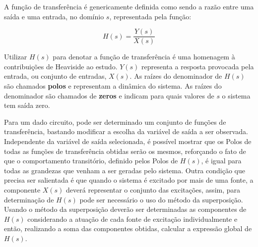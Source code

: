 \documentclass[12pt,fleqn]{book} %
\begin{document}
A função de transferência é genericamente definida como sendo a razão entre uma saída e uma entrada, no domínio $s$, representada pela função:

\begin{equation}
H(s) = \frac{Y(s)}{X(s)}
\end{equation}

Utilizar $H(s)$ para denotar a função de transferência é uma homenagem à contribuições de Heaviside ao estudo. $Y(s)$ representa a resposta provocada pela entrada, ou conjunto de entradas, $X(s)$. As raízes do denominador de $H(s)$ são chamados \textbf{polos} e representam a dinâmica do sistema. As raízes do denominador são chamados de \textbf{zeros} e indicam para quais valores de $s$ o sistema tem saída zero.

Para um dado circuito, pode ser determinado um conjunto de funções de transferência, bastando modificar a escolha da variável de saída a ser observada. Independente da variável de saída selecionada, é possível mostrar que os Polos de todas as funções de transferência obtidas serão os mesmos, reforçando o fato de que o comportamento transitório, definido pelos Polos de $H(s)$, é igual para todas as grandezas que venham a ser geradas pelo sistema. Outra condição que precisa ser salientada é que quando o sistema é excitado por mais de uma fonte, a componente $X(s)$ deverá representar o conjunto das excitações, assim, para determinação de $H(s)$ pode ser necessário o uso do método da superposição. Usando o método da superposição deverão ser determinadas as componentes de $H(s)$ considerando a atuação de cada fonte de excitação individualmente e então, realizando a soma das componentes obtidas, calcular a expressão global de $H(s)$.
\end{document}
